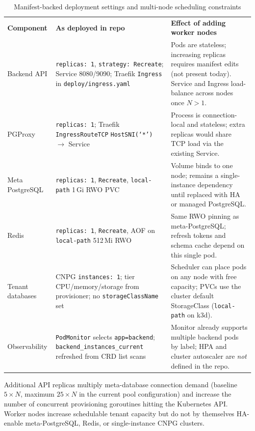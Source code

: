 \begin{table}[H]
    \centering
    \small
    \renewcommand{\arraystretch}{1.25}
    \begin{tabularx}{\textwidth}{|>{\RaggedRight\arraybackslash}p{2.6cm}|>{\RaggedRight\arraybackslash}X|>{\RaggedRight\arraybackslash}X|}
    \hline
    \textbf{Component} & \textbf{As deployed in repo} & \textbf{Effect of adding worker nodes} \\
    Backend API &
    \texttt{replicas: 1}, \texttt{strategy: Recreate}; Service 8080/9090; Traefik \texttt{Ingress} in \texttt{deploy/ingress.yaml} &
    Pods are stateless; increasing replicas requires manifest edits (not present today). Service and Ingress load-balance across nodes once $N>1$. \\
    \hline
    PGProxy &
    \texttt{replicas: 1}; Traefik \texttt{IngressRouteTCP} \texttt{HostSNI(`*')} $\rightarrow$ Service &
    Process is connection-local and stateless; extra replicas would share TCP load via the existing Service. \\
    \hline
    Meta PostgreSQL &
    \texttt{replicas: 1}, \texttt{Recreate}, \texttt{local-path} 1\,Gi RWO PVC &
    Volume binds to one node; remains a single-instance dependency until replaced with HA or managed PostgreSQL. \\
    \hline
    Redis &
    \texttt{replicas: 1}, \texttt{Recreate}, AOF on \texttt{local-path} 512\,Mi RWO &
    Same RWO pinning as meta-PostgreSQL; refresh tokens and schema cache depend on this single pod. \\
    \hline
    Tenant databases &
    CNPG \texttt{instances: 1}; tier CPU/memory/storage from provisioner; no \texttt{storageClassName} set &
    Scheduler can place pods on any node with free capacity; PVCs use the cluster default StorageClass (\texttt{local-path} on k3d). \\
    \hline
    Observability &
    \texttt{PodMonitor} selects \texttt{app=backend}; \texttt{backend\_instances\_current} refreshed from CRD list scans &
    Monitor already supports multiple backend pods by label; HPA and cluster autoscaler are \emph{not} defined in the repo. \\
    \hline
    \end{tabularx}
    \caption{Manifest-backed deployment settings and multi-node scheduling constraints}
    \label{tab:multinode_scaling}
\end{table}

Additional API replicas multiply meta-database connection demand (baseline $5 \times N$, maximum $25 \times N$ in the current pool configuration) and increase the number of concurrent provisioning goroutines hitting the Kubernetes API. Worker nodes increase schedulable tenant capacity but do not by themselves HA-enable meta-PostgreSQL, Redis, or single-instance CNPG clusters.

